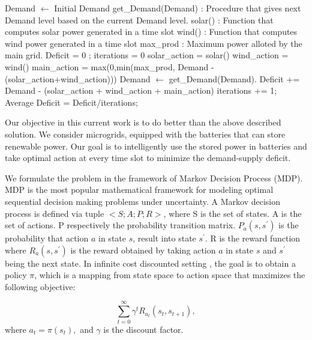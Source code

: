\documentclass[conference]{IEEEtran}
\begin{document}
\begin{algorithm}
\caption{}
\label{greedy}
\begin{algorithmic}[1]
	\State Demand $\leftarrow$ Initial Demand
    \State get\_Demand(Demand) : Procedure that gives next Demand level based on the current Demand level.
    \State solar() : Function that computes solar power generated in a time slot
    \State wind() : Function that computes wind power generated in a time slot
    \State max\_prod : Maximum power alloted by the main grid.
    \State Deficit = 0 ; iterations = 0
     \State solar\_action = solar()
     \State wind\_action = wind()
     \State main\_action = max(0,min(max\_prod, Demand - (solar\_action+wind\_action)))
     \State Demand $\leftarrow$ get\_Demand(Demand).
     \State Deficit += Demand - (solar\_action + wind\_action + main\_action)
     \State iterations += 1;
    \EndProcedure
    \State Average Deficit = Deficit/iterations;
    
\end{algorithmic}
\end{algorithm}


Our objective in this current work is to do better than the above described solution. We consider microgrids, equipped with the batteries that can store renewable power. Our goal is to intelligently use the stored power in batteries and take optimal action at every time slot to minimize the demand-supply deficit.

We formulate the problem in the framework of Markov Decision Process (MDP). MDP \cite{sutton} is the most popular mathematical framework for modeling optimal sequential decision making problems under uncertainty. A Markov decision process is defined via tuple $< S; A; P;R >$, where S is the set of states. A is the set of actions. P respectively the probability transition matrix. $P_{a}(s,s^{'})$ is the probability that action $a$ in state $s$, result into state $s^{'}$. R is the reward function where $R_{a}(s,s^{'})$ is the reward obtained by taking action $a$ in state $s$ and $s^{'}$ being the next state. In infinite cost discounted setting \cite{vol1}, the goal is to obtain a policy $\pi$, which is a mapping from state space to action space that maximizes the following objective:

\begin{equation}
\sum_{t = 0}^{\infty} \gamma^{t}R_{a_{t}}(s_{t},s_{t+1}),
\end{equation}
where $a_{t} = \pi(s_{t}),$ and $\gamma$ is the discount factor.
\end{document}
